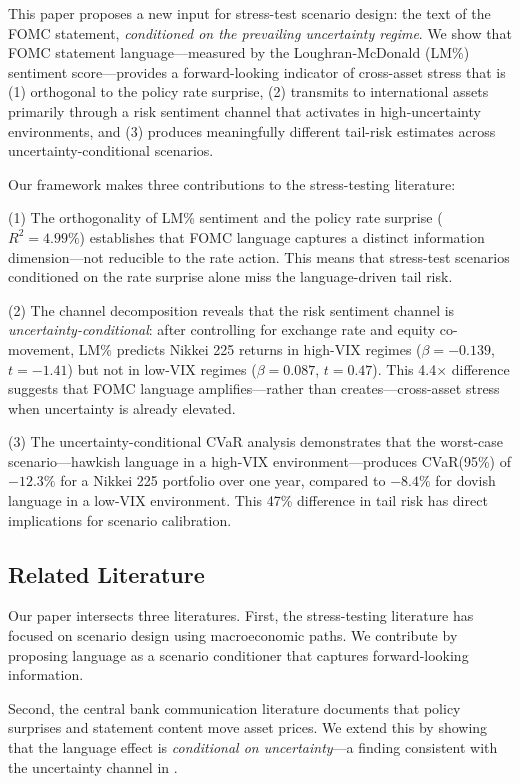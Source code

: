 \documentclass[11pt]{article}
\begin{document}
This paper proposes a new input for stress-test scenario design: the text of the FOMC statement, \textit{conditioned on the prevailing uncertainty regime}. We show that FOMC statement language---measured by the Loughran-McDonald (LM\%) sentiment score---provides a forward-looking indicator of cross-asset stress that is (1) orthogonal to the policy rate surprise, (2) transmits to international assets primarily through a risk sentiment channel that activates in high-uncertainty environments, and (3) produces meaningfully different tail-risk estimates across uncertainty-conditional scenarios.

Our framework makes three contributions to the stress-testing literature:

(1) The orthogonality of LM\% sentiment and the policy rate surprise ($R^2 = 4.99\%$) establishes that FOMC language captures a distinct information dimension---not reducible to the rate action. This means that stress-test scenarios conditioned on the rate surprise alone miss the language-driven tail risk.

(2) The channel decomposition reveals that the risk sentiment channel is \textit{uncertainty-conditional}: after controlling for exchange rate and equity co-movement, LM\% predicts Nikkei 225 returns in high-VIX regimes ($\beta = -0.139$, $t = -1.41$) but not in low-VIX regimes ($\beta = 0.087$, $t = 0.47$). This 4.4$\times$ difference suggests that FOMC language amplifies---rather than creates---cross-asset stress when uncertainty is already elevated.

(3) The uncertainty-conditional CVaR analysis demonstrates that the worst-case scenario---hawkish language in a high-VIX environment---produces CVaR(95\%) of $-12.3\%$ for a Nikkei 225 portfolio over one year, compared to $-8.4\%$ for dovish language in a low-VIX environment. This 47\% difference in tail risk has direct implications for scenario calibration.

\subsection{Related Literature}

Our paper intersects three literatures. First, the stress-testing literature \citep{Schuermann2014, GoldsteinSapra2014} has focused on scenario design using macroeconomic paths. We contribute by proposing language as a scenario conditioner that captures forward-looking information.

Second, the central bank communication literature \citep{Kuttner2001, GSS2005, JarocinskiKaradi2020, MirandaAgrippinoRicco2021} documents that policy surprises and statement content move asset prices. We extend this by showing that the language effect is \textit{conditional on uncertainty}---a finding consistent with the uncertainty channel in \citet{Bloom2009}.
\end{document}
